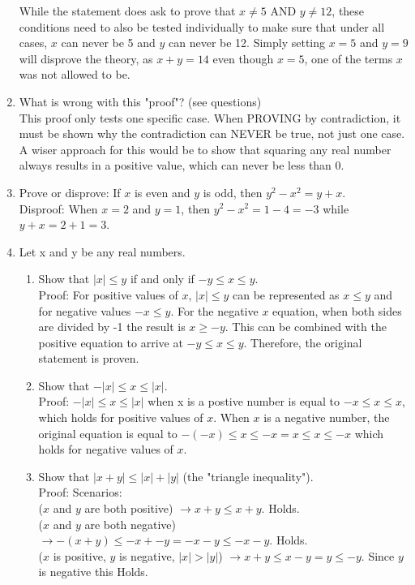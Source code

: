 \documentclass{article}
\begin{document}
\begin{enumerate}
    While the statement does ask to prove that $x \neq 5$ AND $y \neq 12$, these conditions need to also be tested individually to make sure that under all cases, $x$ can never be 5 and $y$ can never be 12. Simply setting $x=5$ and $y=9$ will disprove the theory, as $x+y=14$ even though $x=5$, one of the terms $x$ was not allowed to be.  
\item What is wrong with this "proof"? (see questions) \\
    This proof only tests one specific case. When PROVING by contradiction, it must be shown why the contradiction can NEVER be true, not just one case. A wiser approach for this would be to show that squaring any real number always results in a positive value, which can never be less than 0. 
\item Prove or disprove: If $x$ is even and $y$ is odd, then $y^2-x^2=y+x$. \\
    Disproof: When $x=2$ and $y=1$, then $y^2-x^2=1-4=-3$ while $y+x=2+1=3$. \Lightning
\item Let x and y be any real numbers.
    \begin{enumerate}
        \item Show that $|x| \leq y$ if and only if $-y \leq x \leq y$. \\
            Proof: For positive values of $x$, $|x| \leq y$ can be represented as $x \leq y$ and for negative values $-x \leq y$. For the negative $x$ equation, when both sides are divided by -1 the result is $x \geq -y$. This can be combined with the positive equation to arrive at $-y \leq x \leq y$. Therefore, the original statement is proven. 
        \item Show that $-|x| \leq x \leq |x|$.\\
            Proof: $-|x| \leq x \leq |x|$ when x is a postive number is equal to $-x \leq x \leq x$, which holds for positive values of $x$. When $x$ is a negative number, the original equation is equal to $-(-x) \leq x \leq -x = x \leq x \leq -x$ which holds for negative values of $x$. 
        \item Show that $|x+y| \leq |x| + |y|$ (the "triangle inequality"). \\
            Proof: Scenarios: \\
            ($x$ and $y$ are both positive) $\rightarrow x + y \leq x + y$. Holds. \\
            ($x$ and $y$ are both negative) $\rightarrow -(x+y) \leq -x + -y = -x-y \leq -x-y$. Holds. \\
            ($x$ is positive, $y$ is negative, $|x| > |y|$) $\rightarrow x+y \leq x-y =  y \leq -y$. Since $y$ is negative this Holds. \\

\end{enumerate}
\end{enumerate}
\end{document}
